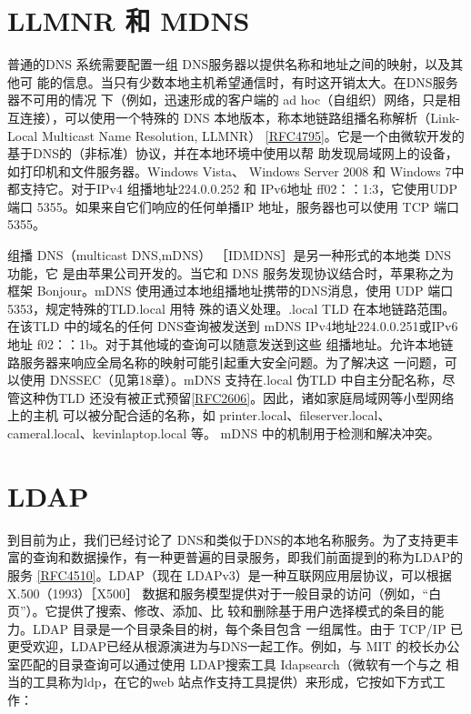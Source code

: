 \section{LLMNR 和 MDNS}

普通的DNS 系统需要配置一组 DNS服务器以提供名称和地址之间的映射，以及其他可
能的信息。当只有少数本地主机希望通信时，有时这开销太大。在DNS服务器不可用的情况
下（例如，迅速形成的客户端的 ad hoc（自组织）网络，只是相互连接），可以使用一个特殊的
DNS 本地版本，称本地链路组播名称解析（Link-Local Multicast Name Resolution, LLMNR）
\href{https://www.rfc-editor.org/rfc/rfc4795}{[RFC4795]}。它是一个由微软开发的基于DNS的（非标准）协议，并在本地环境中使用以帮
助发现局域网上的设备，如打印机和文件服务器。Windows Vista、 Windows Server 2008 和
Windows 7中都支持它。对于IPv4 组播地址224.0.0.252 和 IPv6地址 ff02：：1:3，它使用UDP
端口 5355。如果来自它们响应的任何单播IP 地址，服务器也可以使用 TCP 端口 5355。

组播 DNS（multicast DNS,mDNS） ［IDMDNS］是另一种形式的本地类 DNS 功能，它
是由苹果公司开发的。当它和 DNS 服务发现协议结合时，苹果称之为框架 Bonjour。mDNS
使用通过本地组播地址携带的DNS消息，使用 UDP 端口 5353，规定特殊的TLD.local 用特
殊的语义处理。.local TLD 在本地链路范围。在该TLD 中的域名的任何 DNS查询被发送到
mDNS IPv4地址224.0.0.251或IPv6地址 f02：：1b。对于其他域的查询可以随意发送到这些
组播地址。允许本地链路服务器来响应全局名称的映射可能引起重大安全问题。为了解决这
一问题，可以使用 DNSSEC（见第18章）。mDNS 支持在.local 伪TLD 中自主分配名称，尽
管这种伪TLD
还没有被正式预留\href{https://www.rfc-editor.org/rfc/rfc2606}{[RFC2606]}。因此，诸如家庭局域网等小型网络上的主机
可以被分配合适的名称，如 printer.local、fileserver.local、cameral.local、kevinlaptop.local 等。
mDNS 中的机制用于检测和解决冲突。

\section{LDAP}

到目前为止，我们已经讨论了 DNS和类似于DNS的本地名称服务。为了支持更丰
富的查询和数据操作，有一种更普遍的目录服务，即我们前面提到的称为LDAP的服务
\href{https://www.rfc-editor.org/rfc/rfc4510}{[RFC4510]}。LDAP（现在
LDAPv3）是一种互联网应用层协议，可以根据 X.500（1993）［X500］
数据和服务模型提供对于一般目录的访问（例如，“白页”）。它提供了搜索、修改、添加、比
较和删除基于用户选择模式的条目的能力。LDAP 目录是一个目录条目的树，每个条目包含
一组属性。由于 TCP/IP 已更受欢迎，LDAP已经从根源演进为与DNS一起工作。例如，与
MIT 的校长办公室匹配的目录查询可以通过使用 LDAP搜索工具 Idapsearch（微软有一个与之
相当的工具称为ldp，在它的web 站点作支持工具提供）来形成，它按如下方式工作：

